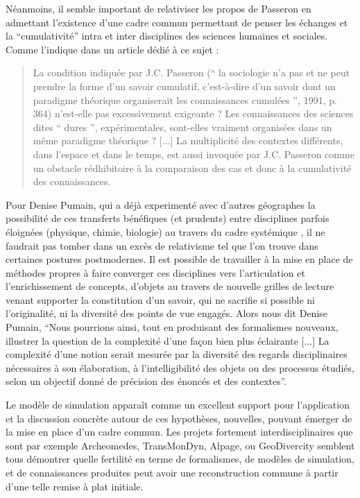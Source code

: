 Néanmoins, il semble important de relativiser les propos de Passeron en admettant l'existence d'une cadre commun permettant de penser les échanges et la \enquote{cumulativité}  intra et inter disciplines des sciences humaines et sociales. Comme l'indique \textcite{Pumain2005} dans un article dédié à ce sujet :

\blockquote[\cite{Pumain2005}]{La condition indiquée par J.C. Passeron (\enquote{ la sociologie n’a pas et ne peut prendre la forme d’un savoir cumulatif, c’est-à-dire d’un savoir dont un paradigme théorique organiserait les connaissances cumulées }, 1991, p. 364) n’est-elle pas excessivement exigeante ? Les connaissances des sciences dites \enquote{ dures }, expérimentales, sont-elles vraiment organisées dans un même paradigme théorique ? [...] La multiplicité des contextes différents, dans l’espace et dans le temps, est aussi invoquée par J.C. Passeron comme un obstacle rédhibitoire à la comparaison des cas et donc à la cumulativité des connaissances.}

Pour Denise Pumain, qui a déjà experimenté avec d'autres géographes la possibilité de ces transferts bénéfiques (et prudents) entre disciplines parfois éloignées (physique, chimie, biologie) au travers du cadre systémique \autocites{Pumain1989,Sanders1992, Dastes1998}, il ne faudrait pas tomber dans un excès de relativisme tel que l'on trouve dans certaines postures postmodernes. Il est possible de travailler à la mise en place de méthodes  propres à faire converger ces disciplines vers l'articulation et l'enrichissement de concepts, d'objets au travers de nouvelle grilles de lecture venant supporter la constitution d'un savoir, qui ne sacrifie si possible ni l'originalité, ni la diversité des points de vue engagés. Alors nous dit Denise Pumain, \enquote{Nous pourrions ainsi, tout en produisant des formalismes nouveaux, illustrer la question de la complexité d’une façon bien plus éclairante [...] La complexité d’une notion serait mesurée par la diversité des regards disciplinaires nécessaires à son élaboration, à l’intelligibilité des objets ou des processus étudiés, selon un objectif donné de précision des énoncés et des contextes}.

Le modèle de simulation apparaît comme un excellent support pour l'application et la discussion concrète autour de ces hypothèses, nouvelles, pouvant émerger de la mise en place d'un cadre commun. Les projets fortement interdisciplinaires que sont par exemple Archeomedes, TransMonDyn, Alpage, ou GeoDivercity \autocite{Chapron2014} semblent tous démontrer quelle fertilité en terme de formalismes, de modèles de simulation, et de connaissances produites peut avoir une reconstruction commune à partir d'une telle remise à plat initiale.

